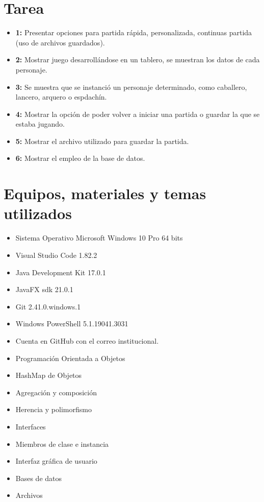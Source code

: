 \documentclass{article}
\begin{document}
\section{Tarea}
\begin{itemize}
	\item \textbf{1:} Presentar opciones para partida rápida, personalizada, continuas partida (uso de archivos guardados).
	\item \textbf{2:} Mostrar juego desarrollándose en un tablero, se muestran los datos de cada personaje.
	\item \textbf{3:} Se muestra que se instanció un personaje determinado, como caballero, lancero, arquero o espdachín.
	\item \textbf{4:} Mostrar la opción de poder volver a iniciar una partida o guardar la que se estaba jugando.
	\item \textbf{5:} Mostrar el archivo utilizado para guardar la partida.
	\item \textbf{6:} Mostrar el empleo de la base de datos.
\end{itemize}
\pagebreak

\section{Equipos, materiales y temas utilizados}
\begin{itemize}
	\item Sistema Operativo Microsoft Windows 10 Pro 64 bits
	\item Visual Studio Code 1.82.2
	\item Java Development Kit 17.0.1
	\item JavaFX sdk 21.0.1
	\item Git 2.41.0.windows.1
	\item Windows PowerShell 5.1.19041.3031
	\item Cuenta en GitHub con el correo institucional.
	\item Programación Orientada a Objetos
	\item HashMap de Objetos
	\item Agregación y composición
	\item Herencia y polimorfismo
	\item Interfaces
	\item Miembros de clase e instancia
	\item Interfaz gráfica de usuario
	\item Bases de datos
	\item Archivos
\end{itemize}
\end{document}
